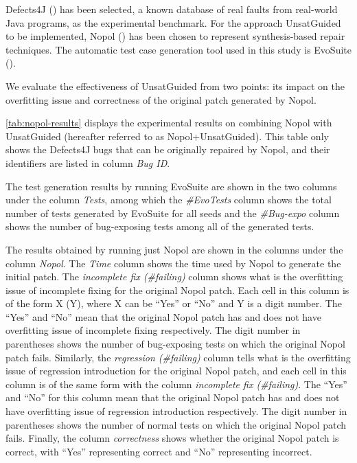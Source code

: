 Defects4J (\cite{JustJE2014}) has been selected, a known database of real faults from real-world Java programs, as the experimental benchmark.
For the approach UnsatGuided to be implemented, Nopol (\cite{nopol}) has been chosen to represent synthesis-based repair techniques. 
The automatic test case generation tool used in this study is EvoSuite (\cite{ESECFSE11}).

We evaluate the effectiveness of UnsatGuided from two points: its impact on the overfitting issue and correctness of the original patch generated by Nopol.

\autoref{tab:nopol-results} displays the experimental results on combining Nopol with UnsatGuided (hereafter referred to as Nopol+\-Unsat\-Guided).
This table only shows the Defects4J bugs that can be originally repaired by Nopol, and their identifiers are listed in column \emph{Bug ID}. 

The test generation results by running EvoSuite are shown in the two columns under the column \emph{Tests}, among which the \emph{\#EvoTests} column shows the total number of tests generated by EvoSuite for all seeds and the \emph{\#Bug-expo} column shows the number of bug-exposing tests among all of the generated tests. 

The results obtained by running just Nopol are shown in the columns under the column \emph{Nopol}. 
The \emph{Time} column shows the time used by Nopol to generate the initial patch. 
The \emph{incomplete fix (\#failing)} column shows what is the overfitting issue of incomplete fixing for the original Nopol patch. 
Each cell in this column is of the form X (Y), where X can be ``Yes'' or ``No'' and Y is a digit number. 
The ``Yes'' and ``No'' mean that the original Nopol patch has and does not have overfitting issue of incomplete fixing respectively. 
The digit number in parentheses shows the number of bug-exposing tests on which the original Nopol patch fails. 
Similarly, the \emph{regression (\#failing)} column tells what is the overfitting issue of regression introduction for the original Nopol patch, and each cell in this column is of the same form with the column \emph{incomplete fix (\#failing)}. 
The ``Yes'' and ``No'' for this column mean that the original Nopol patch has and does not have overfitting issue of regression introduction respectively. 
The digit number in parentheses shows the number of normal tests on which the original Nopol patch fails. 
Finally, the column \emph{correctness} shows whether the original Nopol patch is correct, with ``Yes'' representing correct and ``No'' representing incorrect.

